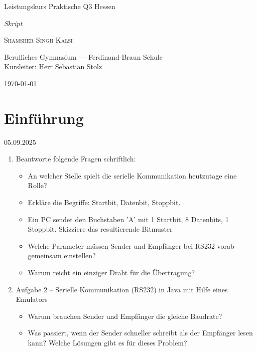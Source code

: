 \documentclass[11pt,a4paper,oneside]{article}
\newcounter{aufgabe}[section]
\renewcommand{\theaufgabe}{\thesection.\arabic{aufgabe}}
\newenvironment{aufgabe}[1]{%
	\refstepcounter{aufgabe}%
	\begin{tcolorbox}[termbase,
		colframe=aufgabeColor!50!black,
		boxed title style={interior style={left color=aufgabeColor, right color=aufgabeColor!70!black}},
		title={Aufgabe~\theaufgabe: #1}]%
	}{\end{tcolorbox}}
\newcommand{\lessondate}[1]{\noindent\hfill\textcolor{Steel}{\textsc{#1}}\\[6pt]}
\newcommand{\MakeArtTitle}[4]{%
	\begin{titlepage}
		\vspace*{18mm}
		\begin{center}
			\vspace{12mm}
			{\huge\color{TextCream} #1 \par}
			\vspace{6mm}
			{\Large\itshape\color{AccentBlue!50} #2 \par}
			\vspace{10mm}
			{\Large\scshape\color{TextCream} #3 \par}
			\vspace{6mm}
			{\small\color{MarginalGray} #4 \par}
			\vfill
			{\small\color{MarginalGray} \today \par}
		\end{center}
	\end{titlepage}
}
\begin{document}
	
	\MakeArtTitle{Leistungskurs Praktische Q3 Hessen}{Skript}{Shamsher Singh Kalsi}{Berufliches Gymnasium — Ferdinand-Braun Schule \\ Kursleiter: Herr Sebastian Stolz}
	
	\tableofcontents
	\bigskip
	
	\newpage
	
	\section{Einführung}
	\lessondate{05.09.2025}
	
	\begin{aufgabe}{Serielle Kommunikation}
		\begin{enumerate}
			\item Beantworte folgende Fragen schriftlich:
			\begin{itemize}
				\item An welcher Stelle spielt die serielle Kommunikation heutzutage eine Rolle?
				\item Erkläre die Begriffe: Startbit, Datenbit, Stoppbit.
				\item Ein PC sendet den Buchstaben 'A' mit 1 Startbit, 8 Datenbits, 1 Stoppbit. Skizziere das resultierende Bitmuster
				\item Welche Parameter müssen Sender und Empfänger bei RS232 vorab gemeinsam einstellen?
				\item Warum reicht ein einziger Draht für die Übertragung?
			\end{itemize}
			\item Aufgabe 2 – Serielle Kommunikation (RS232) in Java mit Hilfe eines Emulators
			\begin{itemize}
				\item Warum brauchen Sender und Empfänger die gleiche Baudrate?
				\item Was passiert, wenn der Sender schneller schreibt als der Empfänger lesen kann? Welche Lösungen gibt es für dieses Problem?
			\end{itemize}
		\end{enumerate}
	\end{aufgabe}
	
	\newpage
	
\end{document}

